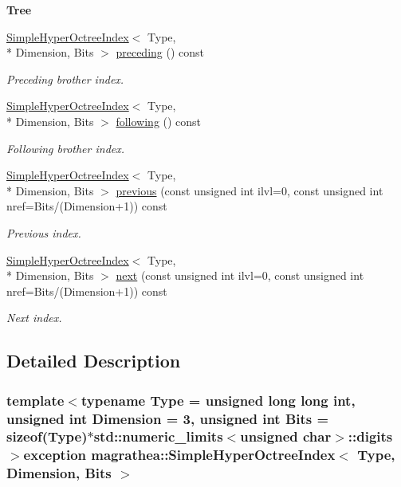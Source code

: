 \begin{Indent}{\bf Tree}
\begin{DoxyCompactItemize}
\hyperlink{exceptionmagrathea_1_1SimpleHyperOctreeIndex}{Simple\-Hyper\-Octree\-Index}$<$ Type, \\*
Dimension, Bits $>$ \hyperlink{exceptionmagrathea_1_1SimpleHyperOctreeIndex_ab31248321a42ee3863b4c1e83325033c}{preceding} () const 
\begin{DoxyCompactList}\small\item\em Preceding brother index. \end{DoxyCompactList}\item 
\hyperlink{exceptionmagrathea_1_1SimpleHyperOctreeIndex}{Simple\-Hyper\-Octree\-Index}$<$ Type, \\*
Dimension, Bits $>$ \hyperlink{exceptionmagrathea_1_1SimpleHyperOctreeIndex_a4428edce812174cf4f1d876525a3293b}{following} () const 
\begin{DoxyCompactList}\small\item\em Following brother index. \end{DoxyCompactList}\item 
\hyperlink{exceptionmagrathea_1_1SimpleHyperOctreeIndex}{Simple\-Hyper\-Octree\-Index}$<$ Type, \\*
Dimension, Bits $>$ \hyperlink{exceptionmagrathea_1_1SimpleHyperOctreeIndex_add550d82a42c38fb89eb2ac0ccd45f82}{previous} (const unsigned int ilvl=0, const unsigned int nref=Bits/(Dimension+1)) const 
\begin{DoxyCompactList}\small\item\em Previous index. \end{DoxyCompactList}\item 
\hyperlink{exceptionmagrathea_1_1SimpleHyperOctreeIndex}{Simple\-Hyper\-Octree\-Index}$<$ Type, \\*
Dimension, Bits $>$ \hyperlink{exceptionmagrathea_1_1SimpleHyperOctreeIndex_a813ce4269b76919feac0f614a844c992}{next} (const unsigned int ilvl=0, const unsigned int nref=Bits/(Dimension+1)) const 
\begin{DoxyCompactList}\small\item\em Next index. \end{DoxyCompactList}\end{DoxyCompactItemize}
\end{Indent}


\subsection{Detailed Description}
\subsubsection*{template$<$typename Type = unsigned long long int, unsigned int Dimension = 3, unsigned int Bits = sizeof(\-Type)$\ast$std\-::numeric\-\_\-limits$<$unsigned char$>$\-::digits$>$exception magrathea\-::\-Simple\-Hyper\-Octree\-Index$<$ Type, Dimension, Bits $>$}

